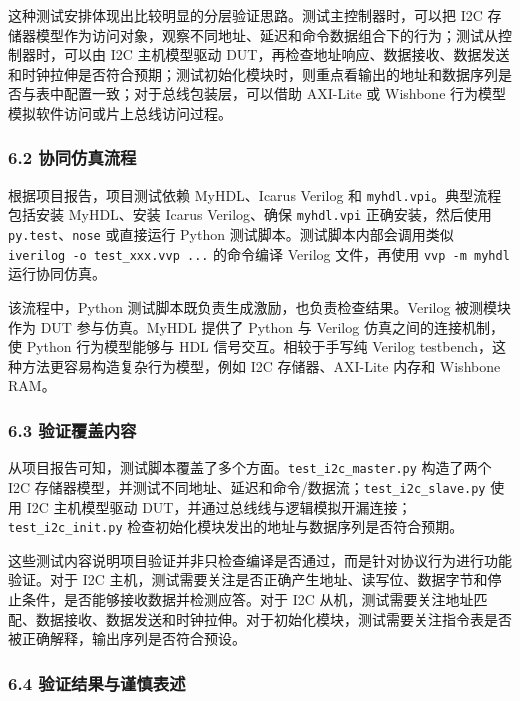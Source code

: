 这种测试安排体现出比较明显的分层验证思路。测试主控制器时，可以把 I2C 存储器模型作为访问对象，观察不同地址、延迟和命令数据组合下的行为；测试从控制器时，可以由 I2C 主机模型驱动 DUT，再检查地址响应、数据接收、数据发送和时钟拉伸是否符合预期；测试初始化模块时，则重点看输出的地址和数据序列是否与表中配置一致；对于总线包装层，可以借助 AXI-Lite 或 Wishbone 行为模型模拟软件访问或片上总线访问过程。

\subsubsection{6.2 协同仿真流程}\label{ux534fux540cux4effux771fux6d41ux7a0b}

根据项目报告，项目测试依赖 MyHDL、Icarus Verilog 和 \texttt{myhdl.vpi}。典型流程包括安装 MyHDL、安装 Icarus Verilog、确保 \texttt{myhdl.vpi} 正确安装，然后使用 \texttt{py.test}、\texttt{nose} 或直接运行 Python 测试脚本。测试脚本内部会调用类似 \texttt{iverilog\ -o\ test\_xxx.vvp\ ...} 的命令编译 Verilog 文件，再使用 \texttt{vvp\ -m\ myhdl} 运行协同仿真。

该流程中，Python 测试脚本既负责生成激励，也负责检查结果。Verilog 被测模块作为 DUT 参与仿真。MyHDL 提供了 Python 与 Verilog 仿真之间的连接机制，使 Python 行为模型能够与 HDL 信号交互。相较于手写纯 Verilog testbench，这种方法更容易构造复杂行为模型，例如 I2C 存储器、AXI-Lite 内存和 Wishbone RAM。

\subsubsection{6.3 验证覆盖内容}\label{ux9a8cux8bc1ux8986ux76d6ux5185ux5bb9}

从项目报告可知，测试脚本覆盖了多个方面。\texttt{test\_i2c\_master.py} 构造了两个 I2C 存储器模型，并测试不同地址、延迟和命令/数据流；\texttt{test\_i2c\_slave.py} 使用 I2C 主机模型驱动 DUT，并通过总线线与逻辑模拟开漏连接；\texttt{test\_i2c\_init.py} 检查初始化模块发出的地址与数据序列是否符合预期。

这些测试内容说明项目验证并非只检查编译是否通过，而是针对协议行为进行功能验证。对于 I2C 主机，测试需要关注是否正确产生地址、读写位、数据字节和停止条件，是否能够接收数据并检测应答。对于 I2C 从机，测试需要关注地址匹配、数据接收、数据发送和时钟拉伸。对于初始化模块，测试需要关注指令表是否被正确解释，输出序列是否符合预设。

\subsubsection{6.4 验证结果与谨慎表述}\label{ux9a8cux8bc1ux7ed3ux679cux4e0eux8c28ux614eux8868ux8ff0}


